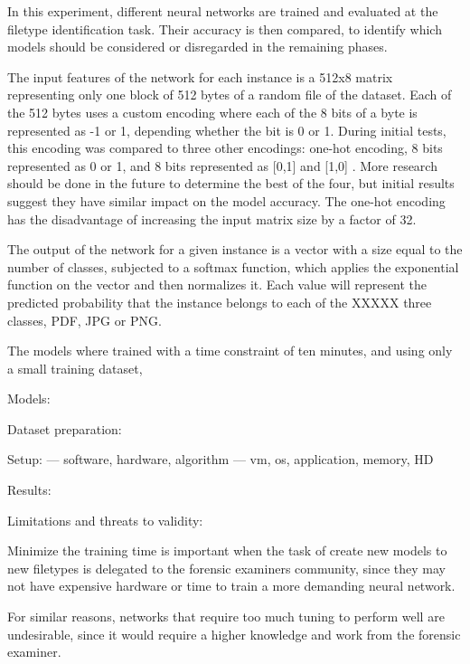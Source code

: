 In this experiment, different neural networks are trained and evaluated
at the filetype identification task. Their accuracy is then compared,
to identify which models should be considered or disregarded in the remaining phases.

The input features of the network for each instance is a 512x8 matrix representing only one block of 512 bytes of a random file of the dataset. Each of the 512 bytes uses a custom encoding where each of the 8 bits of a byte is represented as -1 or 1, depending whether the bit is 0 or 1. During initial tests, this encoding was compared to three other encodings: one-hot encoding, 8 bits represented as 0 or 1, and 8 bits represented as [0,1] and [1,0] \cite{hiester_file_2018}. More research should be done in the future to determine the best of the four, but initial results suggest they have similar impact on the model accuracy. The one-hot encoding has the disadvantage of increasing the input matrix size by a factor of 32.

The output of the network for a given instance is a vector with a size equal to the number of classes, subjected to a softmax function, which applies the exponential function on the vector and then normalizes it. Each value will represent the predicted probability that the instance belongs to each of the 
XXXXX
three classes, PDF, JPG or PNG.




The models where trained with a time constraint of ten minutes, and using only a small training dataset,

Models:


Dataset preparation:



Setup:
--- software, hardware, algorithm
--- vm, os, application, memory, HD

Results:

Limitations and threats to validity:


Minimize the training time is important when the task of create new models to new filetypes is delegated to the forensic examiners community, since they may not have expensive hardware or time to train a more demanding neural network.

For similar reasons, networks that require too much tuning to perform well are undesirable, since it would require a higher knowledge and work from the forensic examiner.


